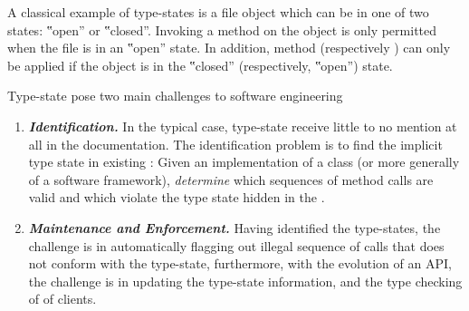 A classical example of type-states is a file object which can be in one of two
states: ‟open” or ‟closed”. Invoking a  method on the object is only
permitted when the file is in an ‟open” state. In addition, method 
(respectively ) can only be applied if the object is in the
‟closed” (respectively, ‟open”) state.

Type-state pose two main challenges to software engineering
\begin{enumerate}
  \item \emph{\textbf{Identification.}}
    In the typical case, type-state
        receive little to no mention at all in the documentation.
    The identification problem is to find the implicit
    type state in existing \Java: Given an implementation of a class
    (or more generally of a software framework),
    \emph{determine} which sequences of method calls are valid and which violate the
    type state hidden in the \Java.
  \item \emph{\textbf{Maintenance and Enforcement.}}
    Having identified the type-states, the challenge is in automatically flagging out
      illegal sequence of calls that does not conform
      with the type-state, furthermore, with the
      evolution of an API, the challenge is in updating the type-state information,
      and the type checking of \Java of clients.
\end{enumerate}
